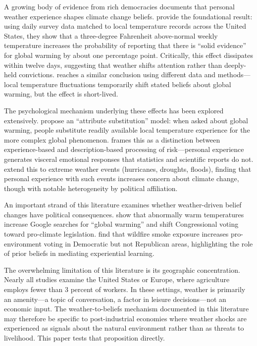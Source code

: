\documentclass[12pt]{article}
\begin{document}
A growing body of evidence from rich democracies documents that personal weather experience shapes climate change beliefs. \citet{eganmullin2012} provide the foundational result: using daily survey data matched to local temperature records across the United States, they show that a three-degree Fahrenheit above-normal weekly temperature increases the probability of reporting that there is ``solid evidence'' for global warming by about one percentage point. Critically, this effect dissipates within twelve days, suggesting that weather shifts attention rather than deeply-held convictions. \citet{deryugina2013} reaches a similar conclusion using different data and methods---local temperature fluctuations temporarily shift stated beliefs about global warming, but the effect is short-lived.

The psychological mechanism underlying these effects has been explored extensively. \citet{zaval2014} propose an ``attribute substitution'' model: when asked about global warming, people substitute readily available local temperature experience for the more complex global phenomenon. \citet{weber2006} frames this as a distinction between experience-based and description-based processing of risk---personal experience generates visceral emotional responses that statistics and scientific reports do not. \citet{konisky2016} extend this to extreme weather events (hurricanes, droughts, floods), finding that personal experience with such events increases concern about climate change, though with notable heterogeneity by political affiliation.

An important strand of this literature examines whether weather-driven belief changes have political consequences. \citet{herrnstadt2014} show that abnormally warm temperatures increase Google searches for ``global warming'' and shift Congressional voting toward pro-climate legislation. \citet{hazlett2020} find that wildfire smoke exposure increases pro-environment voting in Democratic but not Republican areas, highlighting the role of prior beliefs in mediating experiential learning.

The overwhelming limitation of this literature is its geographic concentration. Nearly all studies examine the United States or Europe, where agriculture employs fewer than 3 percent of workers. In these settings, weather is primarily an amenity---a topic of conversation, a factor in leisure decisions---not an economic input. The weather-to-beliefs mechanism documented in this literature may therefore be specific to post-industrial economies where weather shocks are experienced as signals about the natural environment rather than as threats to livelihood. This paper tests that proposition directly.
\end{document}
